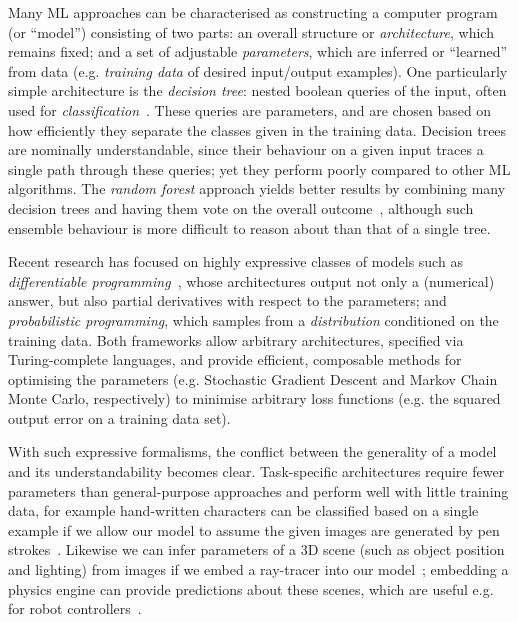 \documentclass[letterpaper]{article}
\begin{document}
Many ML approaches can be characterised as constructing a computer
program (or ``model'') consisting of two parts: an overall structure
or \emph{architecture}, which remains fixed; and a set of adjustable
\emph{parameters}, which are inferred or ``learned'' from data
(e.g. \emph{training data} of desired input/output examples). One
particularly simple architecture is the \emph{decision tree}: nested
boolean queries of the input, often used for
\emph{classification}~\cite{safavian1991survey}. These queries are
parameters, and are chosen based on how efficiently they separate the
classes given in the training data.  Decision trees are nominally
understandable, since their behaviour on a given input traces a single
path through these queries; yet they perform poorly compared to other
ML algorithms. The \emph{random forest} approach yields better results
by combining many decision trees and having them vote on the overall
outcome~\cite{randomforests}, although such ensemble behaviour is more
difficult to reason about than that of a single tree.

Recent research has focused on highly expressive classes of models such as
\emph{differentiable programming}~\cite{wang2018demystifying}, whose
architectures output not only a (numerical) answer, but also partial derivatives
with respect to the parameters; and \emph{probabilistic programming}, which
samples from a \emph{distribution} conditioned on the training data. Both
frameworks allow arbitrary architectures, specified via Turing-complete
languages, and provide efficient, composable methods for optimising the
parameters (e.g. Stochastic Gradient Descent and Markov Chain Monte Carlo,
respectively) to minimise arbitrary loss functions (e.g. the squared output
error on a training data set).

With such expressive formalisms, the conflict between the generality
of a model and its understandability becomes clear. Task-specific
architectures require fewer parameters than general-purpose approaches
and perform well with little training data, for example hand-written
characters can be classified based on a single example if we allow our
model to assume the given images are generated by pen
strokes~\cite{lake2015human}. Likewise we can infer parameters of a 3D
scene (such as object position and lighting) from images if we embed a
ray-tracer into our model~\cite{li2018differentiable}; embedding a
physics engine can provide predictions about these scenes, which are
useful e.g. for robot controllers~\cite{degrave2016differentiable}.
\end{document}
